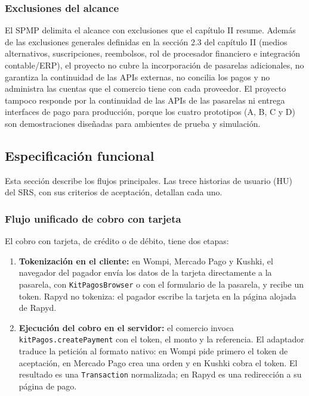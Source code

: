 \subsubsection{Exclusiones del alcance}
El SPMP delimita el alcance con exclusiones que el capítulo II resume. Además de las exclusiones generales definidas en la sección 2.3 del capítulo II (medios alternativos, suscripciones, reembolsos, rol de procesador financiero e integración contable/ERP), el proyecto no cubre la incorporación de pasarelas adicionales, no garantiza la continuidad de las APIs externas, no concilia los pagos y no administra las cuentas que el comercio tiene con cada proveedor. El proyecto tampoco responde por la continuidad de las APIs de las pasarelas ni entrega interfaces de pago para producción, porque los cuatro prototipos (A, B, C y D) son demostraciones diseñadas para ambientes de prueba y simulación.

\subsection{Especificación funcional}
Esta sección describe los flujos principales. Las trece historias de usuario (HU) del SRS, con sus criterios de aceptación, detallan cada uno.

\subsubsection{Flujo unificado de cobro con tarjeta}
El cobro con tarjeta, de crédito o de débito, tiene dos etapas:
\begin{enumerate}
    \item \textbf{Tokenización en el cliente:} en Wompi, Mercado Pago y Kushki, el navegador del pagador envía los datos de la tarjeta directamente a la pasarela, con \texttt{KitPagosBrowser} o con el formulario de la pasarela, y recibe un token. Rapyd no tokeniza: el pagador escribe la tarjeta en la página alojada de Rapyd.
    \item \textbf{Ejecución del cobro en el servidor:} el comercio invoca \texttt{kitPagos.createPayment} con el token, el monto y la referencia. El adaptador traduce la petición al formato nativo: en Wompi pide primero el token de aceptación, en Mercado Pago crea una orden y en Kushki cobra el token. El resultado es una \texttt{Transaction} normalizada; en Rapyd es una redirección a su página de pago.
\end{enumerate}

